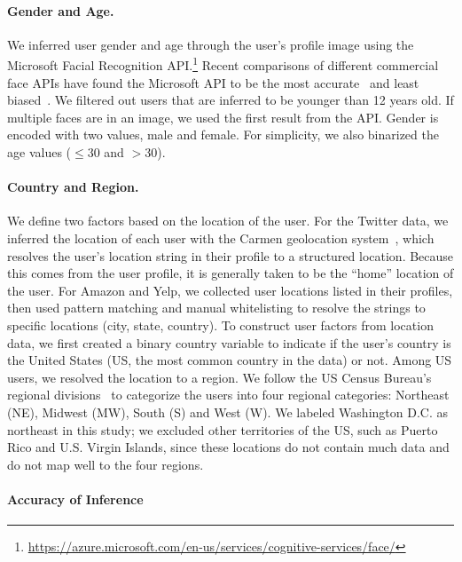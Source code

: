 \paragraph{Gender and Age.} We inferred user gender and age through the user's profile image using the Microsoft Facial Recognition API.\footnote{\url{https://azure.microsoft.com/en-us/services/cognitive-services/face/}}
Recent comparisons of different commercial face APIs have found the Microsoft API to be the most accurate~\cite{jung2018assessing} and least biased~\cite{buolamwini2018gender}.
We filtered out users that are inferred to be younger than 12 years old. If multiple faces are in an image, we used the first result from the API. 
Gender is encoded with two values, male and female. 
For simplicity, we also binarized the age values ($\leq$$30$ and $>$$30$).

\paragraph{Country and Region.} 
We define two factors based on the location of the user.
For the Twitter data, we inferred the location of each user with the Carmen geolocation system~\cite{dredze2013carmen},
which resolves the user's location string in their profile to a structured location. Because this comes from the user profile, it is generally taken to be the ``home'' location of the user.
For Amazon and Yelp, we collected user locations listed in their profiles,
then used pattern matching and manual whitelisting to resolve the strings to specific locations (city, state, country). 
To construct user factors from location data,
we first created a binary country variable
to indicate if the user's country is the United States (US, the most common country in the data) or not. 
Among US users, we resolved the location to a region.
We follow the US Census Bureau's regional divisions~\cite{branch_2012} to categorize the users into four regional categories: Northeast (NE), Midwest (MW), South (S) and West (W). We labeled Washington D.C. as northeast in this study;
we excluded other territories of the US, such as Puerto Rico and U.S. Virgin Islands, since these locations do not contain much data and do not map well to the four regions.

\paragraph{Accuracy of Inference}

